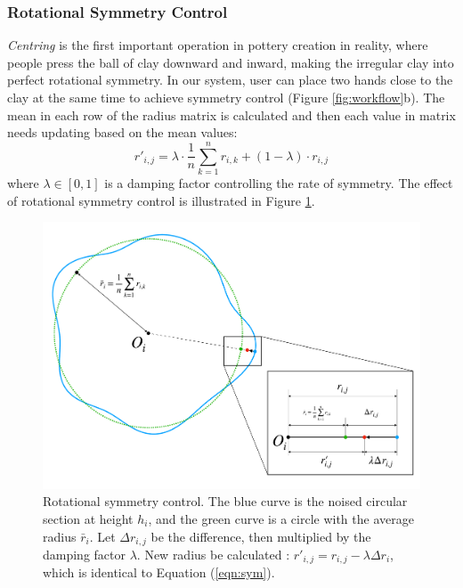 \documentclass{svjour3}                     %
\begin{document}
\subsubsection{Rotational Symmetry Control}
\label{sec:4.2.1}
\textit{Centring} is the first important operation in pottery creation in reality, where people press the ball of clay downward and inward, making the irregular clay into perfect rotational symmetry.
In our system, user can place two hands close to the clay at the same time to achieve symmetry control (Figure \ref{fig:workflow}b).
The mean in each row of the radius matrix is calculated and then each value in matrix needs updating based on the mean values:
\begin{equation}
\label{eqn:sym}
r'_{i,j} = 
\lambda \cdot \frac{1}{n}\sum_{k=1}^{n} r_{i,k}
+ (1 - \lambda) \cdot r_{i,j}
\end{equation}
where $\lambda \in [0,1]$ is a damping factor controlling the rate of symmetry.
The effect of rotational symmetry control is illustrated in Figure \ref{fig:symmetry}.

\begin{figure}
\includegraphics[width=\textwidth]{fig5.pdf}
\caption{Rotational symmetry control. The blue curve is the noised circular section at height $h_{i}$, and the green curve is a circle with the average radius $\bar r_{i}$. Let $\Delta r_{i,j}$ be the difference, then multiplied by the damping factor $\lambda$. New radius be calculated : $r'_{i, j} = r_{i,j} - \lambda\Delta r_{i}$, which is identical to Equation (\ref{eqn:sym}). }
\label{fig:symmetry}
\end{figure}
\end{document}
